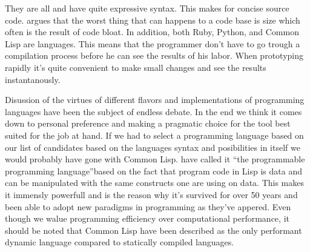 They are all %
and have quite expressive syntax. This makes for concise source code.
\citet{yegge07} argues that the worst thing that can happens to a code base is
size which often is the result of code bloat. In addition, both Ruby, Python,
and Common Lisp are  languages.%
This means that the programmer don't have to go trough a compilation process
before he can see the results of his labor. When prototyping rapidly it's
quite convenient to make small changes and see the results instantanously.

Disussion of the virtues of different flavors and implementations of
programming languages have been the subject of endless debate.
In the end we think it comes down to
personal preference and making a pragmatic choice for the tool best suited for
the job at hand. If we had to select a programming language based on our list
of candidates based on the languages syntax and posibilities in itself we
would probably have gone with Common Lisp. \citet[p.~27]{foderaro91} have
called it ``the programmable programming language''based on the fact that
program code in Lisp is data and can be manipulated with the same constructs
one are using on data. This makes it immensly powerfull and is the reason why
it's survived for over 50 years \citep[p.~217]{mccarthy78}
and been able to adopt new paradigms in programming as they've appered.
Even though we walue programming efficiency over computational performance,
it should be noted that Common Lisp have been described as the only performant
dynamic language \citep{martin08} compared to statically compiled languages.%

